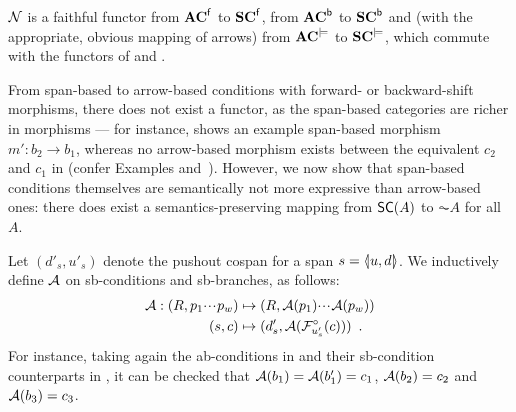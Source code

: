 \begin{theorem}
$\mathcal{N}$ is a faithful functor from $\mathbf{AC}^{\mathsf{f}}$ to $\mathbf{SC}^{\mathsf{f}}$, from $\mathbf{AC}^{\mathsf{b}}$ to $\mathbf{SC}^{\mathsf{b}}$ and (with the appropriate, obvious mapping of arrows) from $\mathbf{AC}^{\models}$ to $\mathbf{SC}^{\models}$, which commute with the functors of  and .
\end{theorem}
%
From span-based to arrow-based conditions with forward- or backward-shift morphisms, there does not exist a functor, as the span-based categories are richer in morphisms --- for instance,  shows an example span-based morphism $m':b_2\to b_1$, whereas no arrow-based morphism exists between the equivalent $c_2$ and $c_1$ in  (confer Examples  and~). However, we now show that span-based conditions themselves are semantically not more expressive than arrow-based ones: there does exist a semantics-preserving mapping from $\SC A$ to $\AC A$ for all $A$.

Let $(d'_s,u'_s)$ denote the pushout cospan for a span $s=\spanof u d$. We inductively define $\mathcal{A}$ on sb-conditions and sb-branches, as follows:
%
\begin{align*}
\mathcal{A}: (R,p_1{\cdotp\mkern-2mu\cdotp\mkern-2mu\cdotp\mkern1mu} p_w) & \mapsto (R,\mathcal{A}(p_1){\cdotp\mkern-2mu\cdotp\mkern-2mu\cdotp\mkern1mu} \mathcal{A}(p_w)) \\
     (s,c) & \mapsto (d'_s,\mathcal{A}(\mathcal{F}^\circ_{u'_s}(c))) \enspace.
\end{align*}
%
For instance, taking again the ab-conditions in  and their sb-condition counterparts in , it can be checked that $\mathcal{A}(b_1)=\mathcal{A}(b'_1)=c_1$, $\mathcal{A}(b_2)=c_2$ and $\mathcal{A}(b_3)=c_3$.

